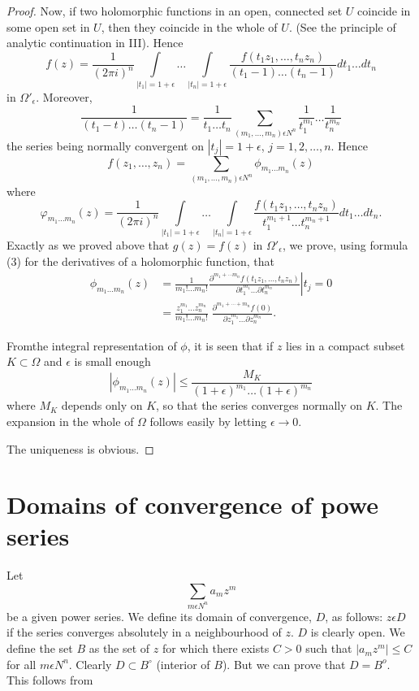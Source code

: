 \begin{proof}
Now, if two holomorphic functions in an open, connected set $U$
coincide in some open set in $U$, then they coincide in the whole of
$U$. (See the principle of analytic continuation in III). Hence
$$
f(z) = \frac{1}{(2\pi i)^n} \int\limits_{|t_1| = 1+ \epsilon} \ldots
\int\limits_{|t_n| = 1+ \epsilon }  \frac{f(t_1z_1, \ldots, t_n
  z_n)}{(t_1-1) \ldots (t_n -1)} dt_1 \ldots dt_n
$$ 
in $\Omega'_\epsilon$. Moreover,
$$
\frac{1}{(t_1-t) \ldots (t_n-1)} = \frac{1}{t_1 \ldots t_n}
\sum\limits_{(m_1,\ldots,m_n) \epsilon N^n} \frac{1}{t_1^{m_1}}  \ldots
\frac{1}{t_n^{m_n}} 
$$
the series being normally convergent on $|t_j| = 1 + \epsilon$, $j =
1,2,\ldots, n$. Hence
$$
f(z_1, \ldots , z_n) = \sum\limits_{(m_1, \ldots, m_n) \epsilon N^n}
\phi_{m_1 \ldots m_n} (z)
$$
where 
$$
\varphi_{m_1 \ldots m_n} (z) = \frac{1}{(2\pi i)^n} \int\limits_{|t_1|
= 1 + \epsilon} \ldots \int\limits_{|t_n|=1+\epsilon} \frac{f(t_1z_1, \ldots,
  t_n z_n)}{t^{m_1+1}_1 \ldots t^{m_n+1}_n} dt_1 \ldots dt_n. 
$$
Exactly as we proved above that $g(z) = f(z)$ in $\Omega'_\epsilon$, we
prove, using formula (3) for the derivatives of a holomorphic
function, that 
\begin{align*}
\phi_{m_1\ldots m_n} (z) & = \frac{1}{m_1 !\ldots m_n!}
\left. \frac{\partial^{ m_1 + \cdots m_n} f(t_1 z_1,\ldots, t_n
  z_n)}{\partial t^{m_1}_1 \ldots \partial t_n^{m_n}}\right| t_j=0 \\
& = \frac{z^{m_1}_1 \ldots z_n^{m_n}}{m_1!\ldots m_n!} \;
\frac{\partial^{ m_1+\cdots + m_n} f(0)}{\partial z_1^{m_1} \ldots
  \partial z_n^{m_n}}. 
\end{align*}

From\pageoriginale the integral representation of $\phi$, it is seen
that if $z$ lies in a compact subset $K\subset \Omega$ and $\epsilon$ is
small enough 
$$
|\phi_{m_1\ldots m_n} (z)| \leq \frac{M_K}{(1+\epsilon)^{m_1} \ldots
  (1+\epsilon)^{m_n}} 
$$
where $M_K$ depends only on $K$, so that the series converges normally
on $K$. The expansion in the whole of $\Omega$ follows easily by
letting $\epsilon\to 0$.

The uniqueness is obvious. 
\end{proof}

\section{Domains of convergence of powe series}\label{chap2:sec2}
Let
$$
\sum\limits_{m\epsilon N^n} a_m z^m
$$
be a given power series. We define its domain of convergence, $D$, as
follows: $z \epsilon D$ if the series converges absolutely in a
neighbourhood of $z$. $D$ is clearly open. We define the set $B$ as
the set of $z$ for which there exists $C>0$ such that $|a_m z^m| \leq
C$ for all $m \epsilon N^n$. Clearly $D \subset B^\circ$ (interior of
$B$). But we can prove that $D=B^o$. This follows from

